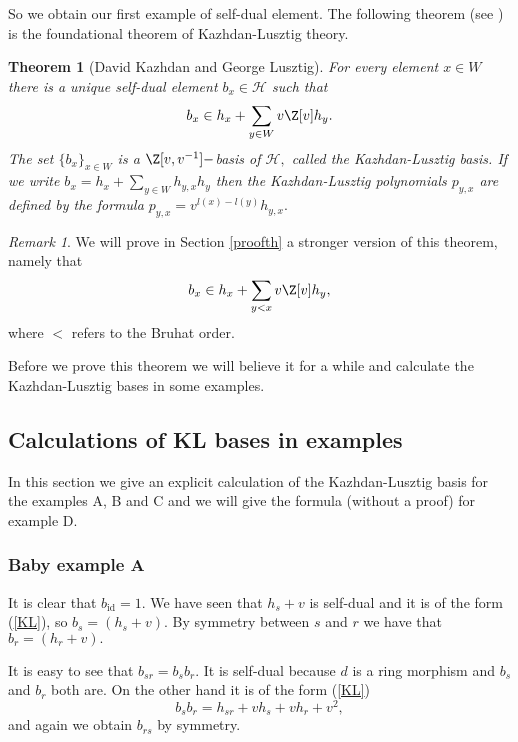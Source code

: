 \documentclass[12pt]{wart}
\newtheorem{thm}{Theorem}[section]
\theoremstyle{remark}
\newtheorem{remark}{Remark}
\begin{document}
So we obtain our first example of self-dual element. 
The following theorem (see  \cite{KL}) is the foundational theorem of Kazhdan-Lusztig theory. 


\begin{thm}[David Kazhdan and George Lusztig]\label{thKL}
For every element $x\in W$ there is a unique self-dual element $b_x\in \mathcal{H}$ such that 
\begin{equation}b_x\in h_x+\sum_{y\in W}v\Z[v]h_y.\end{equation}
The set $\{b_x\}_{x\in W}$  is a $\Z[v,v^{-1}]-$basis of $\mathcal{H},$ called the Kazhdan-Lusztig basis. If we write $b_x= h_x+\sum_{y\in W}h_{y,x}h_y$ then the Kazhdan-Lusztig polynomials $p_{y,x}$ are defined by the formula $p_{y,x}=v^{l(x)-l(y)}h_{y,x}.$
\end{thm}
\begin{remark}\label{rem1} We will prove in Section \ref{proofth} a stronger version of this theorem, namely that \begin{equation}\label{KL}b_x\in h_x+\sum_{y<x}v\Z[v]h_y,\end{equation} where $<$ refers to the Bruhat order. 
\end{remark}

Before we prove this theorem we will believe it for a while and calculate the Kazhdan-Lusztig bases in some  examples. 

\subsection{Calculations of KL bases in examples}

In this section we give an explicit calculation of the Kazhdan-Lusztig basis for the examples A, B and C and we will give the formula (without a  proof) for example D. 

\subsubsection{Baby example A} It is clear that $b_{\mathrm{id}}=1$. We have seen that $h_s+v$ is self-dual and it is of the form (\ref{KL}), so $b_s=(h_s+v).$ By symmetry between $s$ and $r$ we have that $b_r=(h_r+v).$

It is easy to see that $b_{sr}=b_{s}b_{r}$. It is self-dual because $d$ is a ring morphism and $b_{s}$ and $b_{r}$ both are. On the other hand it is of the form (\ref{KL})
$$b_{s}b_{r}=h_{sr}+vh_s+vh_r+v^2,$$
and again we obtain $b_{rs}$ by symmetry. 
\end{document}
